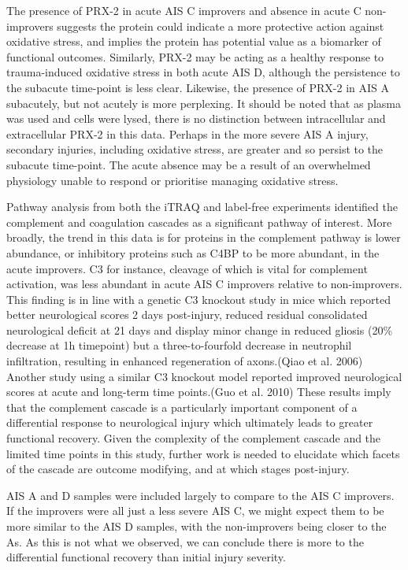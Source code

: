 \documentclass[9pt,lineno]{elife}
\begin{document}
\begin{landscape}
\begin{landscape}
The presence of PRX-2 in acute AIS C improvers and absence in acute C non-improvers suggests the protein could indicate a more protective action against oxidative stress, and implies the protein has potential value as a biomarker of functional outcomes.
Similarly, PRX-2 may be acting as a healthy response to trauma-induced oxidative stress in both acute AIS D, although the persistence to the subacute time-point is less clear.
Likewise, the presence of PRX-2 in AIS A subacutely, but not acutely is more perplexing.
It should be noted that as plasma was used and cells were lysed, there is no distinction between intracellular and extracellular PRX-2 in this data.
Perhaps in the more severe AIS A injury, secondary injuries, including oxidative stress, are greater and so persist to the subacute time-point.
The acute absence may be a result of an overwhelmed physiology unable to respond or prioritise managing oxidative stress.

Pathway analysis from both the iTRAQ and label-free experiments identified the complement and coagulation cascades as a significant pathway of interest.
More broadly, the trend in this data is for proteins in the complement pathway is lower abundance, or inhibitory proteins such as C4BP to be more abundant, in the acute improvers.
C3 for instance, cleavage of which is vital for complement activation, was less abundant in acute AIS C improvers relative to non-improvers.
This finding is in line with a genetic C3 knockout study in mice which reported better neurological scores 2 days post-injury, reduced residual consolidated neurological deficit at 21 days and display minor change in reduced gliosis (20\% decrease at 1h timepoint) but a three-to-fourfold decrease in neutrophil infiltration, resulting in enhanced regeneration of axons.(Qiao et al. 2006) Another study using a similar C3 knockout model reported improved neurological scores at acute and long-term time points.(Guo et al. 2010) These results imply that the complement cascade is a particularly important component of a differential response to neurological injury which ultimately leads to greater functional recovery.
Given the complexity of the complement cascade and the limited time points in this study, further work is needed to elucidate which facets of the cascade are outcome modifying, and at which stages post-injury.

AIS A and D samples were included largely to compare to the AIS C improvers.
If the improvers were all just a less severe AIS C, we might expect them to be more similar to the AIS D samples, with the non-improvers being closer to the As.
As this is not what we observed, we can conclude there is more to the differential functional recovery than initial injury severity.


\end{landscape}
\end{landscape}
\end{document}
